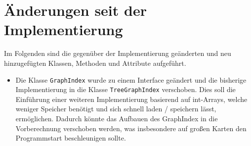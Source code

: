 \documentclass[a4paper, 11pt]{article}
\newcommand{\code}[1]{\texttt{#1}}
\begin{document}
\section{Änderungen seit der Implementierung}
Im Folgenden sind die gegenüber der Implementierung geänderten und neu hinzugefügten Klassen, Methoden und Attribute aufgeführt.

\begin{itemize}
\item Die Klasse \code{GraphIndex} wurde zu einem Interface geändert und die bisherige Implementierung in die Klasse \code{TreeGraphIndex} verschoben.
  Dies soll die Einführung einer weiteren Implementierung basierend auf int-Arrays, welche weniger Speicher benötigt und sich schnell laden / speichern lässt, ermöglichen.
  Dadurch könnte das Aufbauen des GraphIndex in die Vorberechnung verschoben werden, was insbesondere auf großen Karten den Programmstart beschleunigen sollte.
\end{itemize}

\makeatletter
{}
\makeatother
\printglossary[type=main, title={Glossar}, toctitle={Glossar}, style=myAltlist]
\end{document}
